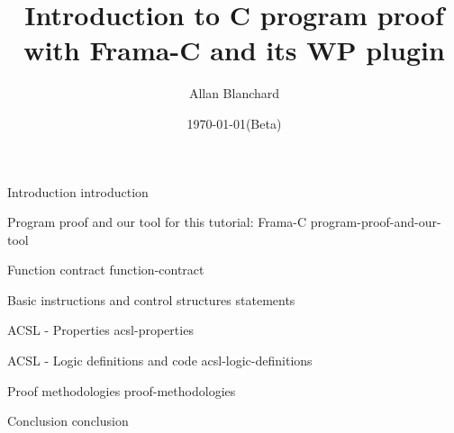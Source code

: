 \documentclass[middle]{zmdocument}
\title{Introduction to C program proof with Frama-C and its WP plugin}
\author{Allan Blanchard}
\date{\today (Beta)}
\begin{document}
\maketitle
\tableofcontents

\begin{levelOne}
  {Introduction}
  {introduction}
\end{levelOne}

\begin{levelOne}
  {Program proof and our tool for this tutorial: Frama-C}
  {program-proof-and-our-tool}
\end{levelOne}

\begin{levelOne}
  {Function contract}
  {function-contract}
\end{levelOne}

\begin{levelOne}
  {Basic instructions and control structures}
  {statements}
\end{levelOne}

\begin{levelOne}
  {ACSL - Properties}
  {acsl-properties}
\end{levelOne}

\begin{levelOne}
  {ACSL - Logic definitions and code}
  {acsl-logic-definitions}
\end{levelOne}

\begin{levelOne}
  {Proof methodologies}
  {proof-methodologies}
\end{levelOne}

\begin{levelOne}
  {Conclusion}
  {conclusion}
\end{levelOne}
\end{document}
